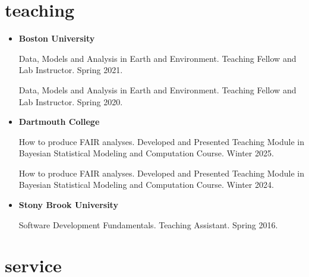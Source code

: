 \documentclass[10pt,oneside]{article}
\begin{document}

\section{teaching}

\mbox{}\vspace{-\dimexpr\baselineskip\relax}


\begin{itemize}[label={}]
  
  \item \textbf{Boston University}
        
        Data, Models and Analysis in Earth and Environment. Teaching Fellow and Lab Instructor. Spring 2021.
        
        Data, Models and Analysis in Earth and Environment. Teaching Fellow and Lab Instructor. Spring 2020.
        
        
  \item \textbf{Dartmouth College}
        
        How to produce FAIR analyses. Developed and Presented Teaching Module in Bayesian Statistical Modeling and Computation Course. Winter 2025.
        
        How to produce FAIR analyses. Developed and Presented Teaching Module in Bayesian Statistical Modeling and Computation Course. Winter 2024.
        
        
  \item \textbf{Stony Brook University}
        
        Software Development Fundamentals. Teaching Assistant. Spring 2016.
        
        
\end{itemize}


\section{service}

\mbox{}\vspace{-\dimexpr\baselineskip\relax}
\end{document}
